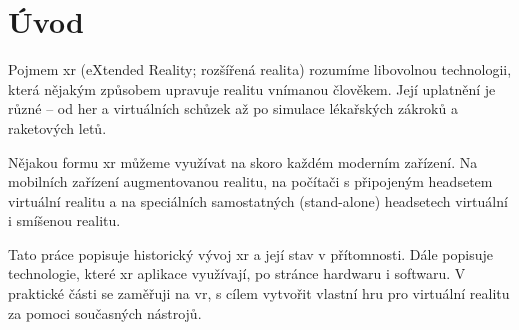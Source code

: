 \chapter*{Úvod}

Pojmem \gls{xr} (eXtended Reality; rozšířená realita) rozumíme libovolnou technologii, která nějakým způsobem upravuje realitu vnímanou člověkem. Její uplatnění je různé -- od her a virtuálních schůzek až po simulace lékařských zákroků a raketových letů. \cite{muni_kybernetika}

Nějakou formu \gls{xr} můžeme využívat na skoro každém moderním zařízení. Na mobilních zařízení augmentovanou realitu, na počítači s připojeným headsetem virtuální realitu a na speciálních samostatných (stand-alone) headsetech virtuální i smíšenou realitu. 

Tato práce popisuje historický vývoj \gls{xr} a její stav v přítomnosti. Dále popisuje technologie, které \gls{xr} aplikace využívají, po stránce hardwaru i softwaru. V praktické části se zaměřuji na \gls{vr}, s cílem vytvořit vlastní hru pro virtuální realitu za pomoci současných nástrojů.
